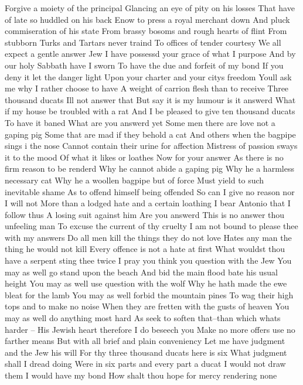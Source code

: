 Forgive a moiety of the principal 
Glancing an eye of pity on his losses 
That have of late so huddled on his back 
Enow to press a royal merchant down 
And pluck commiseration of his state 
From brassy bosoms and rough hearts of flint 
From stubborn Turks and Tartars never traind 
To offices of tender courtesy 
We all expect a gentle answer Jew 
I have possessd your grace of what I purpose 
And by our holy Sabbath have I sworn 
To have the due and forfeit of my bond 
If you deny it let the danger light 
Upon your charter and your citys freedom 
Youll ask me why I rather choose to have 
A weight of carrion flesh than to receive 
Three thousand ducats Ill not answer that 
But say it is my humour is it answerd 
What if my house be troubled with a rat 
And I be pleased to give ten thousand ducats 
To have it baned What are you answerd yet 
Some men there are love not a gaping pig 
Some that are mad if they behold a cat 
And others when the bagpipe sings i the nose 
Cannot contain their urine for affection 
Mistress of passion sways it to the mood 
Of what it likes or loathes Now for your answer 
As there is no firm reason to be renderd 
Why he cannot abide a gaping pig 
Why he a harmless necessary cat 
Why he a woollen bagpipe but of force 
Must yield to such inevitable shame 
As to offend himself being offended 
So can I give no reason nor I will not 
More than a lodged hate and a certain loathing 
I bear Antonio that I follow thus 
A losing suit against him Are you answerd 
This is no answer thou unfeeling man 
To excuse the current of thy cruelty 
I am not bound to please thee with my answers 
Do all men kill the things they do not love 
Hates any man the thing he would not kill 
Every offence is not a hate at first 
What wouldst thou have a serpent sting thee twice 
I pray you think you question with the Jew 
You may as well go stand upon the beach 
And bid the main flood bate his usual height 
You may as well use question with the wolf 
Why he hath made the ewe bleat for the lamb 
You may as well forbid the mountain pines 
To wag their high tops and to make no noise 
When they are fretten with the gusts of heaven 
You may as well do anything most hard 
As seek to soften that--than which whats harder -- 
His Jewish heart therefore I do beseech you 
Make no more offers use no farther means 
But with all brief and plain conveniency 
Let me have judgment and the Jew his will 
For thy three thousand ducats here is six 
What judgment shall I dread doing 
Were in six parts and every part a ducat 
I would not draw them I would have my bond 
How shalt thou hope for mercy rendering none 
